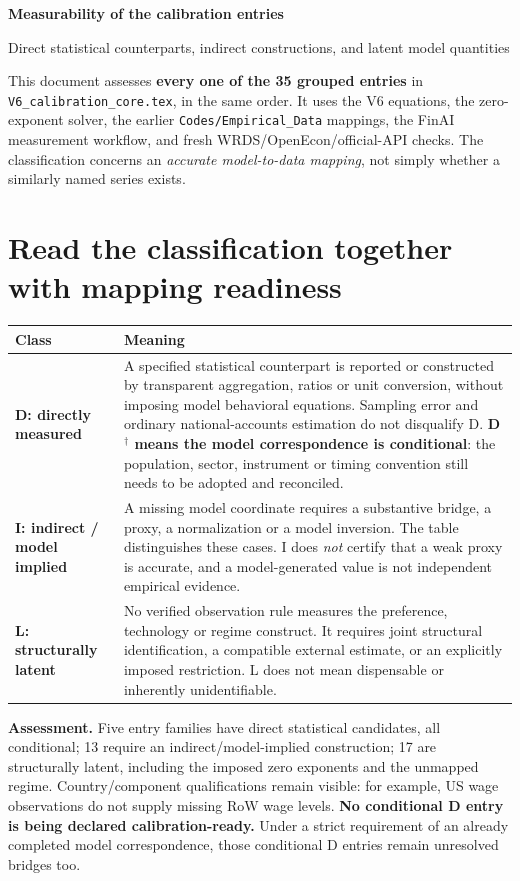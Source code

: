 \documentclass[10pt,a4paper,landscape]{article}
\newcommand{\code}[1]{{\footnotesize\texttt{#1}}}
\begin{document}
{\LARGE\sffamily\bfseries\color{heading}Measurability of the calibration entries}\par
{\large\sffamily Direct statistical counterparts, indirect constructions, and latent model quantities}\par

This document assesses \textbf{every one of the 35 grouped entries} in \code{V6\_calibration\_core.tex}, in the same order. It uses the V6 equations, the zero-exponent solver, the earlier \code{Codes/Empirical\_Data} mappings, the FinAI measurement workflow, and fresh WRDS/OpenEcon/official-API checks. The classification concerns an \emph{accurate model-to-data mapping}, not simply whether a similarly named series exists.

\section*{Read the classification together with mapping readiness}
\begin{longtable}{@{}P{.17\textwidth}P{.79\textwidth}@{}}
\toprule{}\textbf{Class} & \textbf{Meaning}\\\midrule
\textbf{D: directly measured} & A specified statistical counterpart is reported or constructed by transparent aggregation, ratios or unit conversion, without imposing model behavioral equations. Sampling error and ordinary national-accounts estimation do not disqualify D. \textbf{D$^\dagger$ means the model correspondence is conditional}: the population, sector, instrument or timing convention still needs to be adopted and reconciled.\\[5pt]
\textbf{I: indirect / model implied} & A missing model coordinate requires a substantive bridge, a proxy, a normalization or a model inversion. The table distinguishes these cases. I does \emph{not} certify that a weak proxy is accurate, and a model-generated value is not independent empirical evidence.\\[5pt]
\textbf{L: structurally latent} & No verified observation rule measures the preference, technology or regime construct. It requires joint structural identification, a compatible external estimate, or an explicitly imposed restriction. L does not mean dispensable or inherently unidentifiable.\\
\bottomrule
\end{longtable}

\textbf{Assessment.} Five entry families have direct statistical candidates, all conditional; 13 require an indirect/model-implied construction; 17 are structurally latent, including the imposed zero exponents and the unmapped regime. Country/component qualifications remain visible: for example, US wage observations do not supply missing RoW wage levels. \textbf{No conditional D entry is being declared calibration-ready.} Under a strict requirement of an already completed model correspondence, those conditional D entries remain unresolved bridges too.
\end{document}

